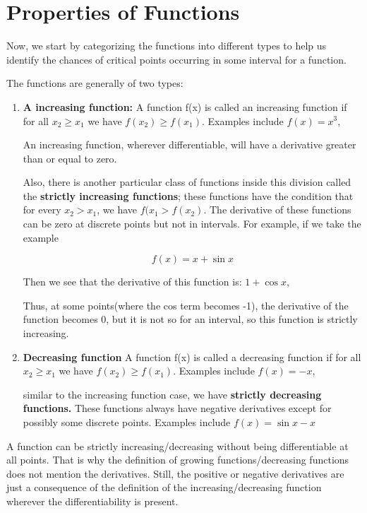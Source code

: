 \section{Properties of Functions}

Now, we start by categorizing the functions into different types to help us identify the chances of critical points occurring in some interval for a function.

The functions are generally of two types:

\begin{enumerate}
    \item \textbf{A increasing function:}
    A function f(x) is called an increasing function if for all $x_2\geq x_1$ we have $f(x_2) \geq f(x_1)$. Examples include $f(x)=x^3$,

    An increasing function, wherever differentiable, will have a derivative greater than or equal to zero.

    Also, there is another particular class of functions inside this division called the \textbf{strictly increasing functions}; these functions have the condition that for every $x_2>x_1$, we have $f(x_1>f(x_2)$. The derivative of these functions can be zero at discrete points but not in intervals. For example, if we take the example 

    $$f(x)=x+\sin x$$

    Then we see that the derivative of this function is: $1+\cos x$,

    Thus, at some points(where the cos term becomes -1), the derivative of the function becomes 0, but it is not so for an interval, so this function is strictly increasing. 


    \item \textbf{Decreasing function}
     A function f(x) is called a decreasing function if for all $x_2\geq x_1$ we have $f(x_2) \geq f(x_1)$. Examples include $f(x)=-x$,


     similar to the increasing function case, we have \textbf{strictly decreasing functions.} These functions always have negative derivatives except for possibly some discrete points. Examples include $f(x)=\sin x -x$
\end{enumerate}


A function can be strictly increasing/decreasing without being differentiable at all points. That is why the definition of growing functions/decreasing functions does not mention the derivatives. Still, the positive or negative derivatives are just a consequence of the definition of the increasing/decreasing function wherever the differentiability is present.


